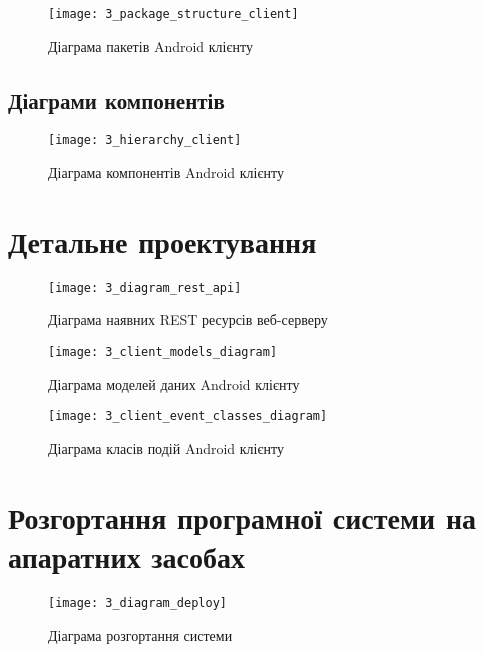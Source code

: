 \documentclass[../main.tex]{subfiles}
\begin{document}
\begin{figure}[H]
	\centering
	\texttt{[image: 3\_package\_structure\_client]}
	\caption{Діаграма пакетів Android клієнту}
	\label{client_packages}
\end{figure}

\subsection{Діаграми компонентів}


\begin{figure}[H]
	\centering
	\texttt{[image: 3\_hierarchy\_client]}
	\caption{Діаграма компонентів Android клієнту}
\end{figure}

\section{Детальне проектування}

\begin{figure}[H]
	\centering
	\texttt{[image: 3\_diagram\_rest\_api]}
	\caption{Діаграма наявних REST ресурсів веб-серверу}
\end{figure}

\begin{figure}[H]
	\centering
	\texttt{[image: 3\_client\_models\_diagram]}
	\caption{Діаграма моделей даних Android клієнту}
\end{figure}

\begin{figure}[H]
	\centering
	\texttt{[image: 3\_client\_event\_classes\_diagram]}
	\caption{Діаграма класів подій Android клієнту}
\end{figure}

\section{Розгортання програмної системи на апаратних засобах}

\begin{figure}[H]
	\centering
	\texttt{[image: 3\_diagram\_deploy]}
	\caption{Діаграма розгортання системи}
\end{figure}
\end{document}
